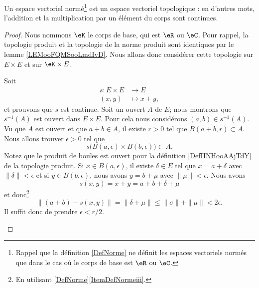 \begin{corollary}       \label{CORooMWCUooKyoyZV}
	Un espace vectoriel normé\footnote{Rappel que la définition \ref{DefNorme} ne définit les espaces vectoriels normés que dans le cas où le corps de base est \( \eR\) ou \( \eC\).} est un espace vectoriel topologique : en d'autres mots, l'addition et la multiplication par un élément du corps sont continues.
\end{corollary}

\begin{proof}
	Nous nommons \( \eK\) le corps de base, qui est \( \eR\) ou \( \eC\). Pour rappel, la topologie produit et la topologie de la norme produit sont identiques par le lemme \ref{LEMooFQMSooLmdIvD}. Nous allons donc considérer cette topologie sur \( E\times E\) et sur \( \eK\times E\).

	\begin{subproof}


		Soit
		\begin{equation}
			\begin{aligned}
				s\colon E\times E & \to E        \\
				(x,y)             & \mapsto x+y,
			\end{aligned}
		\end{equation}
		et prouvons que \( s\) est continue. Soit un ouvert \( A\) de \( E\); nous montrons que \( s^{-1}(A)\) est ouvert dans \( E\times E\). Pour cela nous considérons \( (a,b)\in s^{-1}(A)\). Vu que \( A\) est ouvert et que \( a+b\in A\), il existe \( r>0\) tel que \( B(a+b,r)\subset A\). Nous allons trouver \( \epsilon>0\) tel que
		\begin{equation}
			s\big( B(a,\epsilon)\times B(b,\epsilon) \big)\subset A.
		\end{equation}
		Notez que le produit de boules est ouvert pour la définition \ref{DefIINHooAAjTdY} de la topologie produit. Si \( x\in B(a,\epsilon)\), il existe \( \delta\in E\) tel que \( x=a+\delta\) avec \( \| \delta \|<\epsilon\) et si \( y\in B(b,\epsilon)\), nous avons \( y=b+\mu\) avec \( \| \mu \|<\epsilon\). Nous avons
		\begin{equation}
			s(x,y)=x+y=a+b+\delta+\mu
		\end{equation}
		et donc\footnote{En utilisant \ref{DefNorme}\ref{ItemDefNormeiii}.}
		\begin{equation}
			\| (a+b)-s(x,y) \|=\| \delta+\mu \|\leq \| \sigma \|+\| \mu \|<2\epsilon.
		\end{equation}
		Il suffit donc de prendre \( \epsilon<r/2\).


\end{subproof}
\end{proof}
